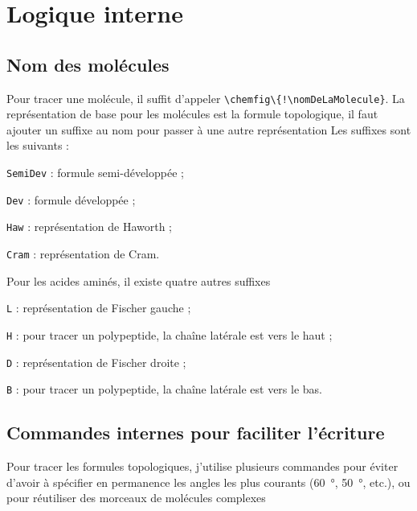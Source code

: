 \section{Logique interne}

\subsection{Nom des molécules}

Pour tracer une molécule, il suffit d'appeler \lstinline|\chemfig\{!\nomDeLaMolecule}|.
La représentation de base pour les molécules est la formule topologique, il faut ajouter un suffixe au nom pour passer à une autre représentation  Les suffixes sont les suivants :

\begin{listePoints}[2]
  \item \lstinline{SemiDev} : formule semi-développée ;
  \item \lstinline{Dev} : formule développée ;
  \item \lstinline{Haw} : représentation de Haworth ;
  \item \lstinline{Cram} : représentation de Cram.
\end{listePoints}
Pour les acides aminés, il existe quatre autres suffixes
\begin{listePoints}[2]
  \item \lstinline{L} : représentation de Fischer gauche ;
  \item \lstinline{H} : pour tracer un polypeptide, la chaîne latérale est vers le haut ;
  \item \lstinline{D} : représentation de Fischer droite ;
  \item \lstinline{B} : pour tracer un polypeptide, la chaîne latérale est vers le bas.
\end{listePoints}

\subsection{Commandes internes pour faciliter l'écriture}

Pour tracer les formules topologiques, 
j'utilise plusieurs commandes pour éviter d'avoir à spécifier en permanence les angles les plus courants
(\qty{60}{\degree}, \qty{50}{\degree}, etc.),
ou pour réutiliser des morceaux de molécules complexes


